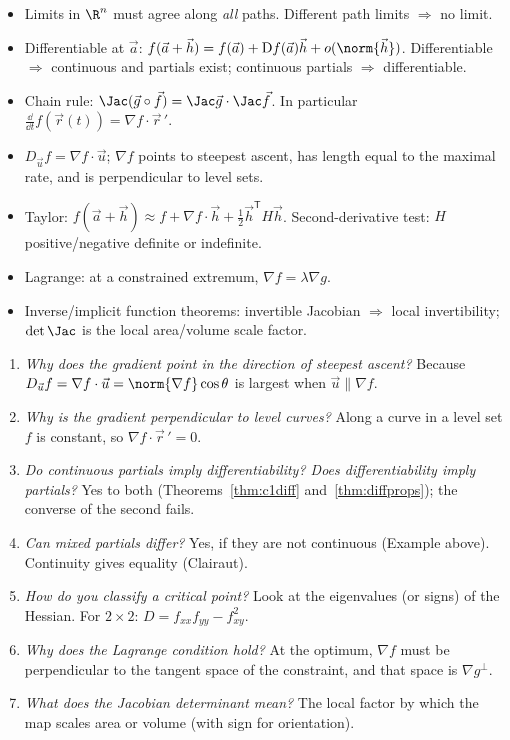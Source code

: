 \begin{summarybox}
\begin{itemize}
  \item Limits in $\R^n$ must agree along \emph{all} paths. Different path limits $\Rightarrow$ no limit.
  \item Differentiable at $\vec a$: $f(\vec a+\vec h)=f(\vec a)+\mathrm{D}f(\vec a)\vec h+o(\norm{\vec h})$. Differentiable $\Rightarrow$ continuous and partials exist; continuous partials $\Rightarrow$ differentiable.
  \item Chain rule: $\Jac(\vec g\circ\vec f)=\Jac\vec g\cdot\Jac\vec f$. In particular $\frac{\dd}{\dd t}f(\vec r(t))=\nabla f\cdot\vec r\,'$.
  \item $D_{\vec u}f=\nabla f\cdot\vec u$; $\nabla f$ points to steepest ascent, has length equal to the maximal rate, and is perpendicular to level sets.
  \item Taylor: $f(\vec a+\vec h)\approx f+\nabla f\cdot\vec h+\tfrac12\vec h^{\mathsf T}H\vec h$. Second-derivative test: $H$ positive/negative definite or indefinite.
  \item Lagrange: at a constrained extremum, $\nabla f=\lambda\nabla g$.
  \item Inverse/implicit function theorems: invertible Jacobian $\Rightarrow$ local invertibility; $\det\Jac$ is the local area/volume scale factor.
\end{itemize}
\end{summarybox}

\begin{interview}
\begin{enumerate}
  \item \emph{Why does the gradient point in the direction of steepest ascent?} Because $D_{\vec u}f=\nabla f\cdot\vec u=\norm{\nabla f}\cos\theta$ is largest when $\vec u\parallel\nabla f$.
  \item \emph{Why is the gradient perpendicular to level curves?} Along a curve in a level set $f$ is constant, so $\nabla f\cdot\vec r\,'=0$.
  \item \emph{Do continuous partials imply differentiability? Does differentiability imply partials?} Yes to both (Theorems~\ref{thm:c1diff} and~\ref{thm:diffprops}); the converse of the second fails.
  \item \emph{Can mixed partials differ?} Yes, if they are not continuous (Example above). Continuity gives equality (Clairaut).
  \item \emph{How do you classify a critical point?} Look at the eigenvalues (or signs) of the Hessian. For $2\times2$: $D=f_{xx}f_{yy}-f_{xy}^2$.
  \item \emph{Why does the Lagrange condition hold?} At the optimum, $\nabla f$ must be perpendicular to the tangent space of the constraint, and that space is $\nabla g^\perp$.
  \item \emph{What does the Jacobian determinant mean?} The local factor by which the map scales area or volume (with sign for orientation).
\end{enumerate}
\end{interview}

